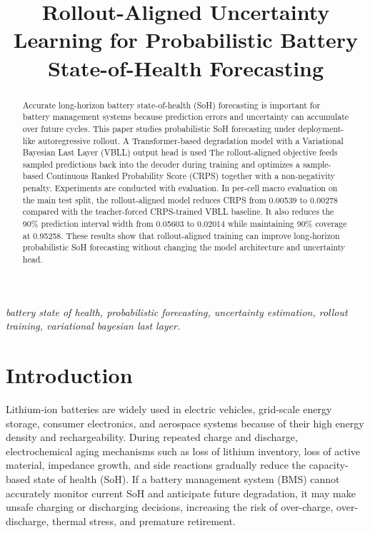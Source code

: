 \documentclass[conference]{IEEEtran}
\begin{document}
\title{Rollout-Aligned Uncertainty Learning for Probabilistic Battery State-of-Health Forecasting}

\author{
}

\maketitle

\begin{abstract}
Accurate long-horizon battery state-of-health (SoH) forecasting is important
for battery management systems because prediction errors and uncertainty can
accumulate over future cycles. This paper studies probabilistic SoH forecasting
under deployment-like autoregressive rollout. A Transformer-based
degradation model with a Variational Bayesian Last Layer (VBLL) output head is used
The rollout-aligned objective feeds sampled predictions back into the decoder
during training and optimizes a sample-based Continuous Ranked Probability
Score (CRPS) together with a non-negativity penalty. Experiments are conducted with evaluation. In per-cell macro evaluation on the main test split, the
rollout-aligned model reduces CRPS from 0.00539 to 0.00278 compared with the
teacher-forced CRPS-trained VBLL baseline. It also reduces the 90\% prediction
interval width from 0.05603 to 0.02014 while maintaining 90\% coverage at
0.95258. These results show that rollout-aligned training can improve
long-horizon probabilistic SoH forecasting without changing the model
architecture and uncertainty head.
\end{abstract}

\vspace{\baselineskip}
\begin{IEEEkeywords}
\normalfont\itshape
battery state of health, probabilistic forecasting, uncertainty estimation,
rollout training, variational bayesian last layer.
\end{IEEEkeywords}

\section{Introduction}

Lithium-ion batteries are widely used in electric vehicles, grid-scale energy
storage, consumer electronics, and aerospace systems because of their high
energy density and rechargeability. During repeated charge and discharge,
electrochemical aging mechanisms such as loss of lithium inventory, loss of
active material, impedance growth, and side reactions gradually reduce the
capacity-based state of health (SoH). If a battery management system (BMS)
cannot accurately monitor current SoH and anticipate future degradation, it
may make unsafe charging or discharging decisions, increasing the risk of
over-charge, over-discharge, thermal stress, and premature retirement.
\end{document}
